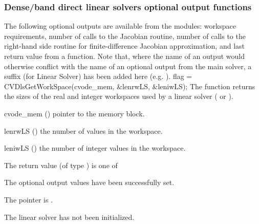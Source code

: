 \subsubsection{Dense/band direct linear solvers optional output functions}
\label{sss:optout_dls}
The following optional outputs are available from the {\cvdls} modules:
workspace requirements, number of calls to the Jacobian routine, number of 
calls to the right-hand side routine for finite-difference Jacobian approximation,
and last return value from a {\cvdls} function.
Note that, where the name of an output would otherwise conflict with
the name of an optional output from the main solver, a suffix 
(for Linear Solver) has been added here (e.g. ).
{
  flag = CVDlsGetWorkSpace(cvode\_mem, \&lenrwLS, \&leniwLS);
}
{
  The function  returns the sizes of the real and
  integer workspaces used by a {\cvdls} linear solver ({\cvdense} or {\cvband}).
}
{
  \begin{args}
  \item[cvode\_mem] ()
    pointer to the {\cvodes} memory block.
  \item[lenrwLS] ()
    the number of  values in the {\cvdls} workspace.
  \item[leniwLS] ()
    the number of integer values in the {\cvdls} workspace.
  \end{args}
}
{
  The return value  (of type ) is one of
  \begin{args}
  \item[\Id{CVDLS\_SUCCESS}] 
    The optional output values have been successfully set.
  \item[\Id{CVDLS\_MEM\_NULL}]
    The  pointer is .
  \item[\Id{CVDLS\_LMEM\_NULL}]
    The {\cvdls} linear solver has not been initialized.
  \end{args}
}
